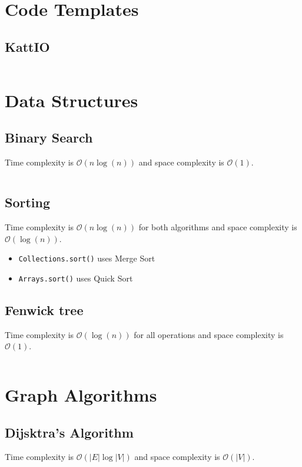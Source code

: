 \documentclass[8pt,a4paper,landscape,oneside]{amsart}
\newcommand{\code}[1]{\inputminted[fontsize=\normalsize,baselinestretch=1]{java}{code/#1}}
\newcommand{\bigO}{\mathcal{O}}
\begin{document}
\begin{multicols*}{3}
\thispagestyle{fancy}
\vspace{-3em}

\tableofcontents
\section{Code Templates}
  \subsection{KattIO}
  \code{Kattio.java}
  
\section{Data Structures}
  \subsection{Binary Search}
  Time complexity is $\bigO(n \log(n))$ and space complexity is $\bigO(1)$.
  \code{Structures/BinarySearch.java}
  \subsection{Sorting}
  Time complexity is $\bigO(n \log(n))$ for both algorithms and space complexity is $\bigO(\log(n))$.
  \begin{itemize}
  \item \texttt{Collections.sort()} uses Merge Sort
  \item \texttt{Arrays.sort()} uses Quick Sort
  \end{itemize}
  
  \subsection{Fenwick tree}
  Time complexity is $\bigO(\log(n))$ for all operations and space complexity is $\bigO(1)$.
  \code{Structures/Fenwick.java}
  
\section{Graph Algorithms}
  \subsection{Dijsktra's Algorithm}
  Time complexity is $\bigO(|E| \log{|V|})$ and space complexity is $\bigO(|V|)$.
  \code{Graphs/Dijkstras.java}

\end{multicols*}
\end{document}
